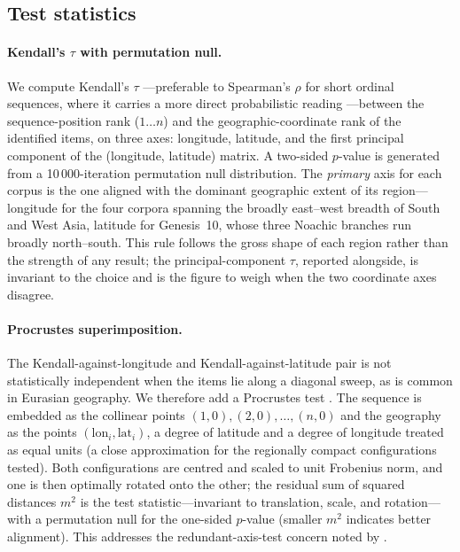 \documentclass[11pt]{article}
\begin{document}
\subsection{Test statistics}\label{sec:stats}

\paragraph{Kendall's $\tau$ with permutation null.}
We compute Kendall's $\tau$ \citep{kendall1938}---preferable to
Spearman's $\rho$ for short ordinal sequences, where it carries a
more direct probabilistic reading \citep{newson2002}---between the
sequence-position rank ($1\ldots n$) and the geographic-coordinate
rank of the identified items, on three axes: longitude, latitude,
and the first principal component of the (longitude, latitude)
matrix. A two-sided $p$-value is generated from a 10\,000-iteration
permutation null distribution. The \emph{primary} axis for each
corpus is the one aligned with the dominant geographic extent of its
region---longitude for the four corpora spanning the broadly
east--west breadth of South and West Asia, latitude for Genesis~10,
whose three Noachic branches run broadly north--south. This rule
follows the gross shape of each region rather than the strength of
any result; the principal-component $\tau$, reported alongside, is
invariant to the choice and is the figure to weigh when the two
coordinate axes disagree.

\paragraph{Procrustes superimposition.}
The Kendall-against-longitude and Kendall-against-latitude pair is
not statistically independent when the items lie along a diagonal
sweep, as is common in Eurasian geography. We therefore add a
Procrustes test \citep{procrustes-orig}. The sequence is embedded as
the collinear points $(1,0),(2,0),\ldots,(n,0)$ and the geography as
the points $(\text{lon}_i,\text{lat}_i)$, a degree of latitude and a
degree of longitude treated as equal units (a close approximation
for the regionally compact configurations tested). Both
configurations are centred and scaled to unit Frobenius norm, and one
is then optimally rotated onto the other; the residual sum of squared
distances $m^2$ is the test statistic---invariant to translation,
scale, and rotation---with a permutation null for the one-sided
$p$-value (smaller $m^2$ indicates better alignment). This addresses
the redundant-axis-test concern noted by
\citet{peresnetojackson2001}.
\end{document}
